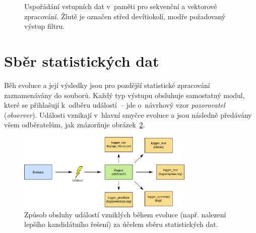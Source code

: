 \begin{figure}[htb]
    \centering
    \baselineskip
    \baselineskip
    \caption{Uspořádání vstupních dat v~paměti pro sekvenční a vektorové zpracování. Žlutě je označen střed devítiokolí, modře požadovaný výstup filtru.}
    \label{obrDevitiokoli}
\end{figure}


\section{Sběr statistických dat}
\label{secImplExperimental}

Běh evoluce a její výsledky jsou pro pozdější statistické zpracování zaznamenávány do souborů. Každý typ výstupu obsluhuje samostatný modul, které se přihlašují k~odběru událostí~-- jde o~návrhový vzor \emph{pozorovatel} (\emph{observer}). Události vznikají v~hlavní smyčce evoluce a jsou následně předávány všem odběratelům, jak znázorňuje obrázek~\ref{obrLoggersHandling}.

\begin{figure}[b]
    \centering
    \includegraphics[width=0.75\textwidth]{fig/loggerevent}
    \caption{Způsob obsluhy událostí vzniklých během evoluce (např. nalezení lepšího kandidátního řešení) za účelem sběru statistických dat.}
    \label{obrLoggersHandling}
\end{figure}

